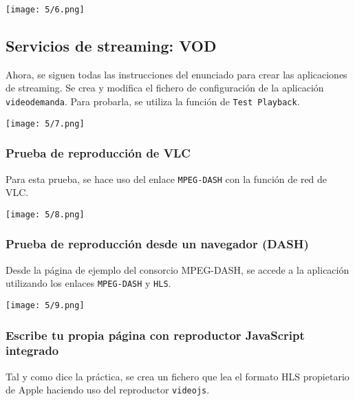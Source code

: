 \begin{minipage}{\linewidth}
	\centering
	\texttt{[image: 5/6.png]}
	\label{fig:5/6}
\end{minipage}

\subsection{Servicios de streaming: VOD}
Ahora, se siguen todas las instrucciones del enunciado para crear las aplicaciones
de streaming. Se crea y modifica el fichero de configuración de la aplicación
\Verb#videodemanda#. Para probarla, se utiliza la función de \Verb#Test Playback#.

\begin{minipage}{\linewidth}
	\centering
	\texttt{[image: 5/7.png]}
	\label{fig:5/7}
\end{minipage}

\subsubsection{Prueba de reproducción de VLC}
Para esta prueba, se hace uso del enlace \Verb#MPEG-DASH# con la función de red de VLC{.}

\begin{minipage}{\linewidth}
	\centering
	\texttt{[image: 5/8.png]}
	\label{fig:5/8}
\end{minipage}

\subsubsection{Prueba de reproducción desde un navegador (DASH)}
Desde la página de ejemplo del consorcio MPEG-DASH, se accede a la aplicación
utilizando los enlaces \Verb#MPEG-DASH# y \Verb#HLS#.

\begin{minipage}{\linewidth}
	\centering
	\texttt{[image: 5/9.png]}
	\label{fig:5/9}
\end{minipage}

\subsubsection{Escribe tu propia página con reproductor JavaScript integrado}\label{sec:5/HLS}
Tal y como dice la práctica, se crea un fichero que lea el formato HLS propietario de Apple
haciendo uso del reproductor \Verb#videojs#.

